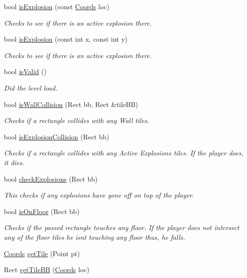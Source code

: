 \begin{DoxyCompactItemize}
bool \hyperlink{class_b_level_adf39bb6a72e7780031a0806df92f9fc5}{is\-Explosion} (const \hyperlink{struct_coords}{\-Coords} loc)
\begin{DoxyCompactList}\small\item\em \-Checks to see if there is an active explosion there. \end{DoxyCompactList}\item 
bool \hyperlink{class_b_level_acf89db789ceb7f083221fab3fead042e}{is\-Explosion} (const int x, const int y)
\begin{DoxyCompactList}\small\item\em \-Checks to see if there is an active explosion there. \end{DoxyCompactList}\item 
bool \hyperlink{class_b_level_ad9a6d59f73f29c78a0b2e57997202eb5}{is\-Valid} ()
\begin{DoxyCompactList}\small\item\em \-Did the level load. \end{DoxyCompactList}\item 
bool \hyperlink{class_b_level_ae32bcaf31096afb8356391e8ad6552e1}{is\-Wall\-Collision} (\-Rect bb, \-Rect \&tile\-B\-B)
\begin{DoxyCompactList}\small\item\em \-Checks if a rectangle collides with any \-Wall tiles. \end{DoxyCompactList}\item 
bool \hyperlink{class_b_level_a432d3dde8efb542646792f9c5563a522}{is\-Explosion\-Collision} (\-Rect bb)
\begin{DoxyCompactList}\small\item\em \-Checks if a rectangle collides with any \-Active \-Explosions tiles. \-If the player does, it dies. \end{DoxyCompactList}\item 
bool \hyperlink{class_b_level_a6526db006b1f862697b1f9f89eb0a968}{check\-Explosions} (\-Rect bb)
\begin{DoxyCompactList}\small\item\em \-This checks if any explosions have gone off on top of the player. \end{DoxyCompactList}\item 
bool \hyperlink{class_b_level_ab79289460372842f15ca0fe13311d7c9}{is\-On\-Floor} (\-Rect bb)
\begin{DoxyCompactList}\small\item\em \-Checks if the passed rectangle touches any floor. \-If the player does not intersect any of the floor tiles he isnt touching any floor thus, he falls. \end{DoxyCompactList}\item 
\hyperlink{struct_coords}{\-Coords} \hyperlink{class_b_level_a6bb41eebd07bf260b42168183bdd37c1}{get\-Tile} (\-Point pt)
\item 
\-Rect \hyperlink{class_b_level_a9adc000ce6523936febd5a4d20d52eb8}{get\-Tile\-B\-B} (\hyperlink{struct_coords}{\-Coords} loc)
\end{DoxyCompactItemize}


